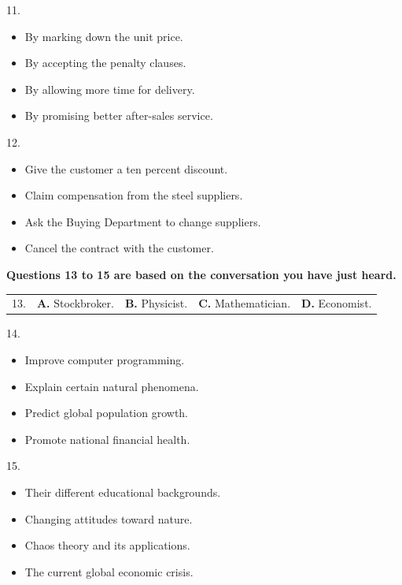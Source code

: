 \documentclass[UTF8,11pt]{ctexart}
\begin{document}
11.


\begin{itemize}[leftmargin=2em,itemsep=.2em,topsep=.4em]\item[A.] By marking down the unit price.
\item[B.] By accepting the penalty clauses.
\item[C.] By allowing more time for delivery.
\item[D.] By promising better after-sales service.
\end{itemize}

12.


\begin{itemize}[leftmargin=2em,itemsep=.2em,topsep=.4em]\item[A.] Give the customer a ten percent discount.
\item[B.] Claim compensation from the steel suppliers.
\item[C.] Ask the Buying Department to change suppliers.
\item[D.] Cancel the contract with the customer.
\end{itemize}

\textbf{Questions 13 to 15 are based on the conversation you have just heard.}


\noindent\begin{tabularx}{\linewidth}{@{}lXXXX@{}}13. & \textbf{A.} Stockbroker. & \textbf{B.} Physicist. & \textbf{C.} Mathematician. & \textbf{D.} Economist.\\\end{tabularx}\par

14.


\begin{itemize}[leftmargin=2em,itemsep=.2em,topsep=.4em]\item[A.] Improve computer programming.
\item[B.] Explain certain natural phenomena.
\item[C.] Predict global population growth.
\item[D.] Promote national financial health.
\end{itemize}

15.


\begin{itemize}[leftmargin=2em,itemsep=.2em,topsep=.4em]\item[A.] Their different educational backgrounds.
\item[B.] Changing attitudes toward nature.
\item[C.] Chaos theory and its applications.
\item[D.] The current global economic crisis.
\end{itemize}
\end{document}
